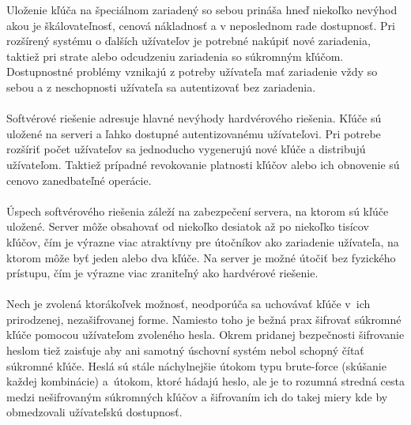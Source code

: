 \documentclass[
  digital, %
  table,   %
oneside,
  nolof,     %
  nolot,     %
]{fithesis3}
\begin{document}
Uloženie kľúča na špeciálnom zariadený so sebou prináša hneď niekoľko nevýhod akou je škálovateľnosť, cenová nákladnosť a v neposlednom rade dostupnosť. Pri rozšírený systému o ďalších užívateľov je potrebné nakúpiť nové zariadenia, taktiež pri strate alebo odcudzeniu zariadenia so súkromným kľúčom. Dostupnostné problémy vznikajú z potreby užívateľa mať zariadenie vždy so sebou a z neschopnosti užívateľa sa autentizovať bez zariadenia. \paragraph{} 
Softvérové riešenie adresuje hlavné nevýhody hardvérového riešenia. Kľúče sú uložené na serveri a ľahko dostupné autentizovanému užívateľovi. Pri potrebe rozšíriť počet užívateľov sa jednoducho vygenerujú nové kľúče a distribujú užívateľom. Taktiež prípadné revokovanie platnosti kľúčov alebo ich obnovenie sú cenovo zanedbateľné operácie. \paragraph{}
Úspech softvérového riešenia záleží na zabezpečení servera, na ktorom sú kľúče uložené. Server môže obsahovať od niekoľko desiatok až po niekoľko tisícov kľúčov, čím je výrazne viac atraktívny pre útočníkov ako zariadenie užívateľa, na ktorom môže byť jeden alebo dva kľúče. Na server je možné útočiť bez fyzického prístupu, čím je výrazne viac zraniteľný ako hardvérové riešenie. \paragraph{}

Nech je zvolená ktorákoľvek možnosť, neodporúča sa  uchovávať kľúče v~ich prirodzenej, nezašifrovanej forme. Namiesto toho je bežná prax šifrovať súkromné kľúče pomocou užívateľom zvoleného hesla. Okrem pridanej bezpečnosti šifrovanie heslom tiež zaisťuje aby ani samotný úschovní systém nebol schopný čítať súkromné kľúče. Heslá sú stále náchylnejšie útokom typu brute-force (skúšanie každej kombinácie) a~útokom, ktoré hádajú heslo, ale je to rozumná stredná cesta medzi nešifrovaným súkromných kľúčov a šifrovaním ich do takej miery kde by obmedzovali užívateľskú dostupnosť. \paragraph{}   
 
\end{document}
